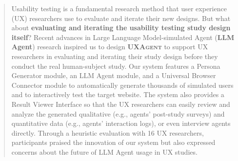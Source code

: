 \documentclass[manuscript,review,anonymous]{acmart}
\DeclareRobustCommand{\projectname}{\textsc{UXAgent}\xspace}
\DeclareRobustCommand{\todo}[1]{{\sethlcolor{red!30!white}\hl{#1}}}
\begin{document}
\author{Toby Jia-Jun Li}

\author{Dakuo Wang}


\renewcommand{\shortauthors}{Lu et al.}
\begin{abstract}
Usability testing is a fundamental research method that user experience (UX) researchers use to evaluate and iterate their new designs. But what about \textbf{evaluating and iterating the usability testing study design itself}?
Recent advances in Large Language Model-simulated Agent (\textbf{LLM Agent}) research inspired us to design \textbf{\projectname} to support UX researchers in evaluating and iterating their study design before they conduct the real human-subject study.
Our system features a Persona Generator module, an LLM Agent module, and a Universal Browser Connector module to automatically generate thousands of simulated users and to interactively test the target website.
The system also provides a Result Viewer Interface so that the UX researchers can easily review and analyze the generated qualitative (e.g., agents' post-study surveys) and quantitative data (e.g., agents' interaction logs), or even interview agents directly. 
Through a heuristic evaluation with 16 UX researchers, participants praised the innovation of our system but also expressed concerns about the future of LLM Agent usage in UX studies.
\end{abstract}
\end{document}
